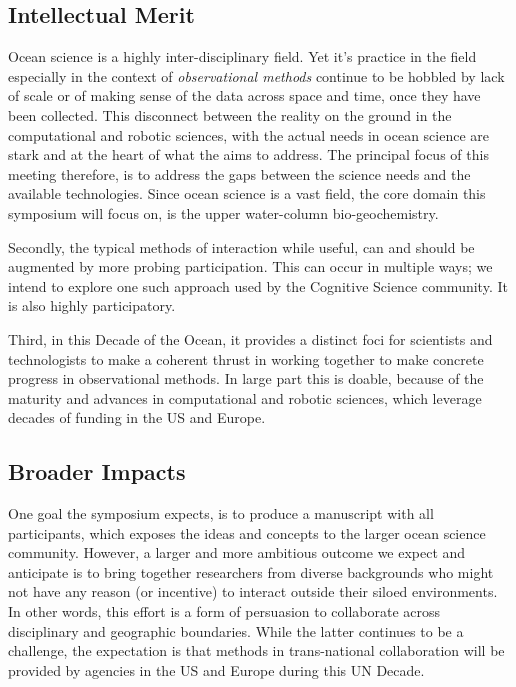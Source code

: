 \subsection{Intellectual Merit}

Ocean science is a highly inter-disciplinary field. Yet it's practice in
the field especially in the context of \emph{observational methods}
continue to be hobbled by lack of scale or of making sense of the data
across space and time, once they have been collected. This disconnect
between the reality on the ground in the computational and robotic
sciences, with the actual needs in ocean science are stark and at the
heart of what the \symp aims to address. The principal focus of this
meeting therefore, is to address the gaps between the science needs and
the available technologies. Since ocean science is a vast field, the
core domain this symposium will focus on, is the upper water-column
bio-geochemistry.

Secondly, the typical methods of interaction while useful, can and
should be augmented by more probing participation. This can occur in
multiple ways; we intend to explore one such approach used by the
Cognitive Science community. It is also highly participatory.

Third, in this Decade of the Ocean, it provides a distinct foci for
scientists and technologists to make a coherent thrust in working
together to make concrete progress in observational methods. In large
part this is doable, because of the maturity and advances in
computational and robotic sciences, which leverage decades of funding in
the US and Europe.

\subsection{Broader Impacts}

One goal the symposium expects, is to produce a manuscript with all
participants, which exposes the ideas and concepts to the larger ocean
science community. However, a larger and more ambitious outcome we
expect and anticipate is to bring together researchers from diverse
backgrounds who might not have any reason (or incentive) to interact
outside their siloed environments. In other words, this effort is a form
of persuasion to collaborate across disciplinary and geographic
boundaries. While the latter continues to be a challenge, the
expectation is that methods in trans-national collaboration will be
provided by agencies in the US and Europe during this UN Decade. 